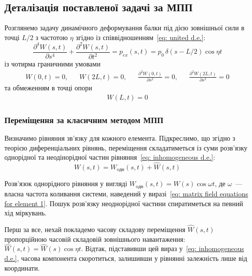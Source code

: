 \subsection*{Деталізація поставленої задачі за МПП}

Розглянемо задачу динамічного деформування балки під дією зовнішньої сили в точці $L/2$ з частотою $\eta$ згідно із співвідношенням~\eqref{eq: united d.e.}:
\begin{equation}\label{eq: inhomogeneous d.e.}
    \frac{\partial^4 W(s,t)}{\partial s^4} + \frac{\partial^2 W(s,t)}{\partial t^2} = p_{ex}(s,t) = p_0\,\delta(s-L/2) \cos{\eta t}
\end{equation}
із чотирма граничними умовами
\begin{align}\label{eq: inhomogeneous edge conditions}
    W(0,t)=0, && W(2L,t)=0, && \frac{\partial^2W(0,t)}{\partial s^2}=0, && \frac{\partial^2W(2L,t)}{\partial s^2}=0
\end{align}
та обмеженням в точці опори
\begin{align}\label{eq: inhomogeneous central condition}
    W(L,t)=0
\end{align}

\subsubsection*{Переміщення за класичним методом МПП}

Визначимо рівняння зв'язку для кожного елемента. Підкреслимо, що згідно з теорією диференціальних рівнянь, переміщення складатиметься із суми розв'язку однорідної та неодінорідної частин рівняння~\eqref{eq: inhomogeneous d.e.}:
\begin{equation}
    W(s,t) = W_{\text{oдн}}(s,t) + \widehat{W}(s,t)
\end{equation}

Розв'язок однорідного рівняння у вигляді $W_{\text{oдн}}(s,t) = W(s)\cos{\omega t}$, де $\omega$~--- власна частота коливання системи, наведений у виразі~\eqref{eq: matrix field equations for element 1}. Пошук розв'язку неоднорідної частини спиратиметься на певний хід міркувань. 

Перш за все, нехай покладемо часову складову переміщення $\widehat{W}(s,t)$ пропорційною часовій складовій зовнішнього навантаження: $\widehat{W}(s,t)=\widehat{W}(s)\cos{\eta t}$. Відтак, підставивши цей вираз у~\eqref{eq: inhomogeneous d.e.}, часова компонента скоротиться, залишивши у рівнянні залежність лише від координати. 

